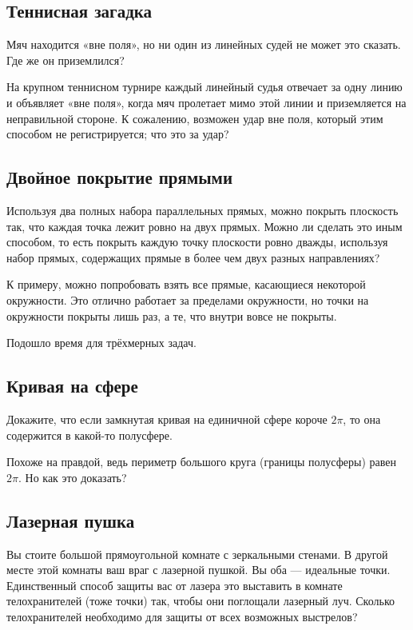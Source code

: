 \subsection*{Теннисная загадка}

Мяч находится «вне поля», но ни один из линейных судей не может это сказать.
Где же он приземлился?

На крупном теннисном турнире каждый линейный судья отвечает за одну линию и объявляет «вне поля», когда мяч пролетает мимо этой линии и приземляется на неправильной стороне.
К сожалению, возможен удар вне поля, который этим способом не регистрируется; что это за удар?

\subsection*{Двойное покрытие прямыми}

Используя два полных набора параллельных прямых, можно покрыть плоскость так, что каждая точка лежит ровно на двух прямых.
Можно ли сделать это иным способом, то есть покрыть каждую точку плоскости ровно дважды, используя набор прямых, содержащих прямые в более чем двух разных направлениях?

 К примеру, можно попробовать взять все прямые, касающиеся некоторой окружности.
Это отлично работает за пределами окружности, но точки на окружности покрыты лишь раз, а те, что внутри вовсе не покрыты.

\medskip

Подошло время для трёхмерных задач.

\subsection*{Кривая на сфере}

Докажите, что если замкнутая кривая на единичной сфере короче $2\pi$, то она содержится в какой-то полусфере.

 Похоже на правдой, ведь периметр большого круга (границы полусферы) равен $2\pi$.
Но как это доказать?

\subsection*{Лазерная пушка}

Вы стоите большой прямоугольной комнате с зеркальными стенами.
В другой месте этой комнаты ваш враг с лазерной пушкой.
Вы оба --- идеальные точки.
Единственный способ защиты вас от лазера это выставить в комнате телохранителей (тоже точки) так, чтобы они поглощали лазерный луч.
Сколько телохранителей необходимо для защиты от всех возможных выстрелов?

